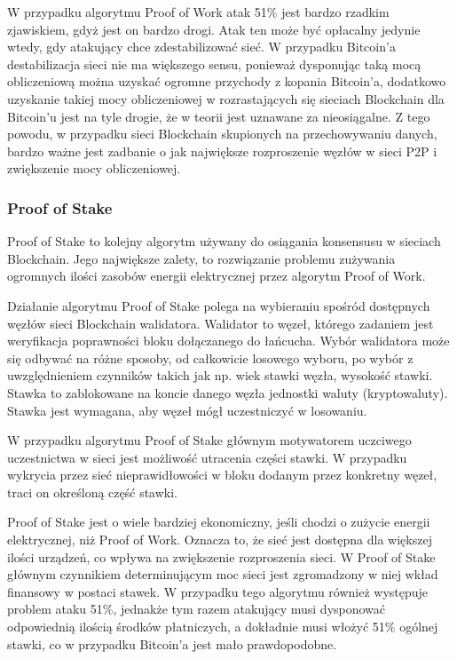 \documentclass[a4paper,13pt]{report}
\begin{document}
W przypadku algorytmu Proof of Work atak 51\% jest bardzo rzadkim zjawiskiem, gdyż jest on bardzo drogi. Atak ten może być opłacalny jedynie wtedy, gdy atakujący chce zdestabilizować sieć. W przypadku Bitcoin'a destabilizacja sieci nie ma większego sensu, ponieważ dysponując taką mocą obliczeniową można uzyskać ogromne przychody z kopania Bitcoin'a, dodatkowo uzyskanie takiej mocy obliczeniowej w rozrastających się sieciach Blockchain dla Bitcoin'u jest na tyle drogie, że w teorii jest uznawane za nieosiągalne. Z tego powodu, w przypadku sieci Blockchain skupionych na przechowywaniu danych, bardzo ważne jest zadbanie o jak największe rozproszenie węzłów w sieci P2P i zwiększenie mocy obliczeniowej.

\subsubsection{Proof of Stake}

Proof of Stake to kolejny algorytm używany do osiągania konsensusu w sieciach Blockchain. Jego największe zalety, to rozwiązanie problemu zużywania ogromnych ilości zasobów energii elektrycznej przez algorytm Proof of Work.

Działanie algorytmu Proof of Stake polega na wybieraniu spośród dostępnych węzłów sieci Blockchain walidatora. Walidator to węzeł, którego zadaniem jest weryfikacja poprawności bloku dołączanego do łańcucha. Wybór walidatora może się odbywać na różne sposoby, od całkowicie losowego wyboru, po wybór z uwzględnieniem czynników takich jak np. wiek stawki węzła, wysokość stawki. Stawka to zablokowane na koncie danego węzła jednostki waluty (kryptowaluty). Stawka jest wymagana, aby węzeł mógł uczestniczyć w losowaniu.

W przypadku algorytmu Proof of Stake głównym motywatorem uczciwego uczestnictwa w sieci jest możliwość utracenia części stawki. W przypadku wykrycia przez sieć nieprawidłowości w bloku dodanym przez konkretny węzeł, traci on określoną część stawki.

Proof of Stake jest o wiele bardziej ekonomiczny, jeśli chodzi o zużycie energii elektrycznej, niż Proof of Work. Oznacza to, że sieć jest dostępna dla większej ilości urządzeń, co wpływa na zwiększenie rozproszenia sieci. W Proof of Stake głównym czynnikiem determinującym moc sieci jest zgromadzony w niej wkład finansowy w postaci stawek. W przypadku tego algorytmu również występuje problem ataku 51\%, jednakże tym razem atakujący musi dysponować odpowiednią ilością środków płatniczych, a dokładnie musi włożyć  51\% ogólnej stawki, co w przypadku Bitcoin'a jest mało prawdopodobne.
\end{document}
